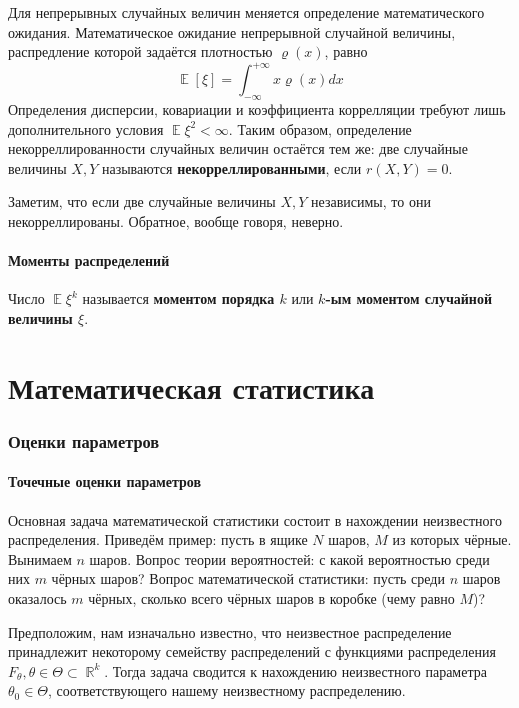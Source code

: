 \documentclass[12pt]{article}
\DeclareMathOperator{\mexp}{\mathbb{E}}
\DeclareMathOperator{\RR}{\mathbb{R}}
\begin{document}
    Для непрерывных случайных величин меняется определение математического ожидания. Математическое ожидание непрерывной случайной величины, распредление которой задаётся плотностью $\varrho(x)$, равно
    \begin{equation*}
        \mexp[\xi] = \int_{-\infty}^{+\infty} x \varrho(x) dx
    \end{equation*}
    Определения дисперсии, ковариации и коэффициента коррелляции требуют лишь дополнительного условия $\mexp \xi^2 < \infty$. Таким образом, определение некорреллированности случайных величин остаётся тем же: две случайные величины $X,Y$ называются \textbf{некорреллированными}, если $r(X, Y) = 0$. 

    Заметим, что если две случайные величины $X, Y$ независимы, то они некорреллированы. Обратное, вообще говоря, неверно.

    \subsection{Моменты распределений}
    Число $\mexp \xi^k$ называется \textbf{моментом порядка $k$} или \textbf{$k$-ым моментом случайной величины $\xi$}. 

    \part{Математическая статистика}
    \section{Оценки параметров}

    \subsection{Точечные оценки параметров}
    Основная задача математической статистики состоит в нахождении неизвестного распределения. Приведём пример: пусть в ящике $N$ шаров, $M$ из которых чёрные. Вынимаем $n$ шаров. Вопрос теории вероятностей: с какой вероятностью среди них $m$ чёрных шаров? Вопрос математической статистики: пусть среди $n$ шаров оказалось $m$ чёрных, сколько всего чёрных шаров в коробке (чему равно $M$)?

    Предположим, нам изначально известно, что неизвестное распределение принадлежит некоторому семейству распределений с функциями распределения $F_\theta, \theta \in \Theta \subset \RR^k$. Тогда задача сводится к нахождению неизвестного параметра $\theta_0 \in \Theta$, соответствующего нашему неизвестному распределению.
\end{document}
